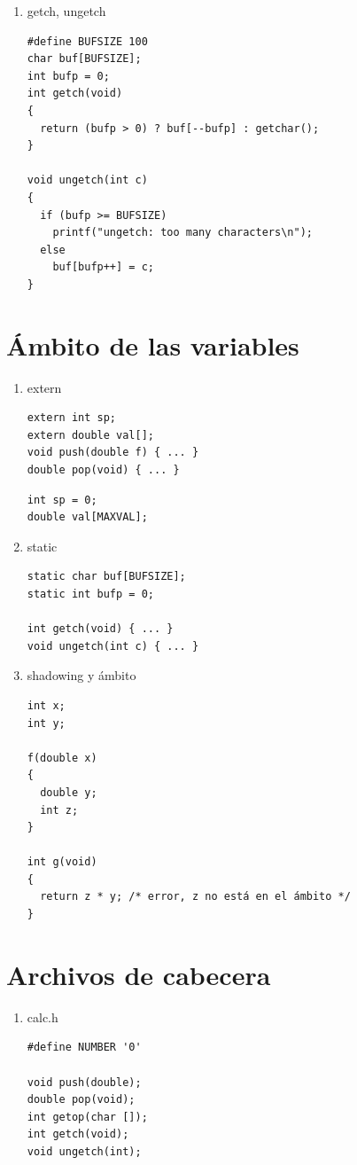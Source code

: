 \documentclass[a4paper,oneside]{article}
\begin{document}
\begin{enumerate}
  \item getch, ungetch

    \begin{verbatim}
#define BUFSIZE 100
char buf[BUFSIZE];
int bufp = 0;
int getch(void)
{
  return (bufp > 0) ? buf[--bufp] : getchar();
}

void ungetch(int c)
{
  if (bufp >= BUFSIZE)
    printf("ungetch: too many characters\n");
  else
    buf[bufp++] = c;
}
    \end{verbatim}
  \end{enumerate}

\section{Ámbito de las variables}
  \begin{enumerate}
    \item extern

    \begin{verbatim}
extern int sp;
extern double val[];
void push(double f) { ... }
double pop(void) { ... }
    \end{verbatim}

    \begin{verbatim}
int sp = 0;
double val[MAXVAL];
    \end{verbatim}

    \item static

    \begin{verbatim}
static char buf[BUFSIZE];
static int bufp = 0;

int getch(void) { ... }
void ungetch(int c) { ... }
    \end{verbatim}

    \newpage
    \item shadowing y ámbito

    \begin{verbatim}
int x;
int y;

f(double x)
{
  double y;
  int z;
}

int g(void)
{
  return z * y; /* error, z no está en el ámbito */
}
    \end{verbatim}
  \end{enumerate}

\section{Archivos de cabecera}
  \begin{enumerate}
    \item calc.h

    \begin{verbatim}
#define NUMBER '0'

void push(double);
double pop(void);
int getop(char []);
int getch(void);
void ungetch(int);
    \end{verbatim}
  \end{enumerate}
\end{document}
